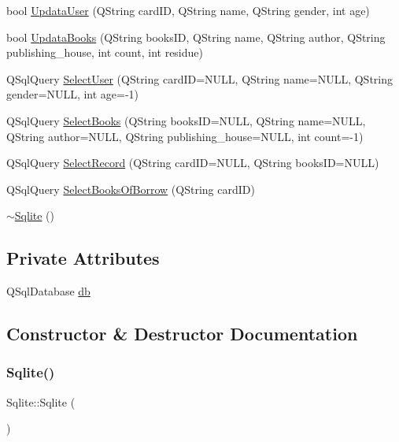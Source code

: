 \begin{DoxyCompactItemize}
\item 
bool \mbox{\hyperlink{class_sqlite_aba86a5371a532d0c7600f9a70c2d00a5}{Updata\+User}} (Q\+String card\+ID, Q\+String name, Q\+String gender, int age)
\item 
bool \mbox{\hyperlink{class_sqlite_a233ae80bda6616c5aacbffcc1dd80c8c}{Updata\+Books}} (Q\+String books\+ID, Q\+String name, Q\+String author, Q\+String publishing\+\_\+house, int count, int residue)
\item 
Q\+Sql\+Query \mbox{\hyperlink{class_sqlite_a7c9c4f27369ce4566bce56614c3e11f0}{Select\+User}} (Q\+String card\+ID=N\+U\+LL, Q\+String name=N\+U\+LL, Q\+String gender=N\+U\+LL, int age=-\/1)
\item 
Q\+Sql\+Query \mbox{\hyperlink{class_sqlite_addc1fbbdf661fd568535ddea8280fbd2}{Select\+Books}} (Q\+String books\+ID=N\+U\+LL, Q\+String name=N\+U\+LL, Q\+String author=N\+U\+LL, Q\+String publishing\+\_\+house=N\+U\+LL, int count=-\/1)
\item 
Q\+Sql\+Query \mbox{\hyperlink{class_sqlite_a3c012aa302538385ce05d0b0371a9860}{Select\+Record}} (Q\+String card\+ID=N\+U\+LL, Q\+String books\+ID=N\+U\+LL)
\item 
Q\+Sql\+Query \mbox{\hyperlink{class_sqlite_ab9e451e38960661c5a493948453b63c7}{Select\+Books\+Of\+Borrow}} (Q\+String card\+ID)
\item 
\mbox{\hyperlink{class_sqlite_adc35a543dca91edc3ffb90a3825dd54a}{$\sim$\+Sqlite}} ()
\end{DoxyCompactItemize}
\subsection*{Private Attributes}
\begin{DoxyCompactItemize}
\item 
Q\+Sql\+Database \mbox{\hyperlink{class_sqlite_afaaed0591ef0d92547dc5f049a22b3a6}{db}}
\end{DoxyCompactItemize}


\subsection{Constructor \& Destructor Documentation}
\mbox{\label{class_sqlite_a8aef4e64531e1522f892c0c6ec69cdff}} 
\subsubsection{\texorpdfstring{Sqlite()}{Sqlite()}}
{\footnotesize\ttfamily Sqlite\+::\+Sqlite (\begin{DoxyParamCaption}{ }\end{DoxyParamCaption})}

